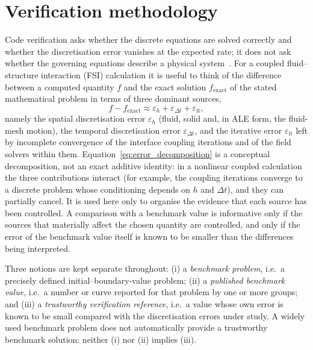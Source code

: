 \section{Verification methodology}\label{sec:verification_methodology}

Code verification asks whether the discrete equations are solved correctly and whether the discretisation error vanishes at the expected rate; it does not ask whether the governing equations describe a physical system~\citep{Roache1998, Oberkampf2010}.
For a coupled fluid--structure interaction (FSI) calculation it is useful to think of the difference between a computed quantity $f$ and the exact solution $f_\mathrm{exact}$ of the stated mathematical problem in terms of three dominant sources,
\begin{equation}
	f - f_\mathrm{exact} \approx \varepsilon_h + \varepsilon_{\Delta t} + \varepsilon_\mathrm{it},
	\label{eq:error_decomposition}
\end{equation}
namely the spatial discretisation error $\varepsilon_h$ (fluid, solid and, in ALE form, the fluid-mesh motion), the temporal discretisation error $\varepsilon_{\Delta t}$, and the iterative error $\varepsilon_\mathrm{it}$ left by incomplete convergence of the interface coupling iterations and of the field solvers within them.
Equation~\eqref{eq:error_decomposition} is a conceptual decomposition, not an exact additive identity: in a nonlinear coupled calculation the three contributions interact (for example, the coupling iterations converge to a discrete problem whose conditioning depends on $h$ and $\Delta t$), and they can partially cancel.
It is used here only to organise the evidence that each source has been controlled.
A comparison with a benchmark value is informative only if the sources that materially affect the chosen quantity are controlled, and only if the error of the benchmark value itself is known to be smaller than the differences being interpreted.

Three notions are kept separate throughout:
(i) a \emph{benchmark problem}, i.e.\ a precisely defined initial--boundary-value problem;
(ii) a \emph{published benchmark value}, i.e.\ a number or curve reported for that problem by one or more groups; and
(iii) a \emph{trustworthy verification reference}, i.e.\ a value whose own error is known to be small compared with the discretisation errors under study.
A widely used benchmark problem does not automatically provide a trustworthy benchmark solution: neither (i) nor (ii) implies (iii).

